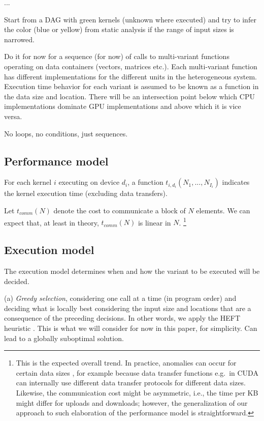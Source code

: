 \documentclass{article}
\begin{document}
...

Start from a DAG with green kernels (unknown where
executed) and try to infer the color (blue or yellow)
from static analysis if the range of input sizes
is narrowed.


Do it for now for a
sequence (for now) of calls to multi-variant
functions operating on data containers (vectors, matrices etc.). Each multi-variant function has
different implementations for the different
units in the heterogeneous system.
Execution time behavior for each variant is
assumed to be known as a function in the
data size and location. There will be an
intersection point below which CPU implementations
dominate GPU implementations and above which it is
vice versa.


No loops, no conditions, just sequences.

\subsection{Performance model}

For each kernel $i$ executing on device $d_i$,
a function $t_{i,d_i}(N_1,...,N_{I_i})$
indicates the kernel execution time
(excluding data transfers). 

Let $t_{comm}(N)$ denote the cost to communicate
a block of $N$ elements. We can expect that,
at least in theory, $t_{comm}(N)$ is linear in $N$.
\footnote{This is the expected overall trend. In practice, anomalies can occur for certain data sizes
\cite{Kessler:SCOPES19}, for
example because data transfer functions e.g.\ in 
CUDA can internally use different data transfer protocols for different data sizes. Likewise,
the communication cost might be asymmetric,
i.e., the time per KB might differ for uploads and downloads; however, the generalization of our
approach to such elaboration of the
performance model is straightforward.}



\subsection{Execution model}

The execution model determines when and how
the variant to be executed will be decided.

(a) \emph{Greedy selection}, considering one call at a time (in program order) and deciding what is locally best considering the input size and locations that are a consequence of the preceding decisions. In other words, we apply the HEFT heuristic \cite{HEFT}. This is what we will consider for now in this paper, for simplicity.
Can lead to a globally suboptimal solution.
\end{document}
